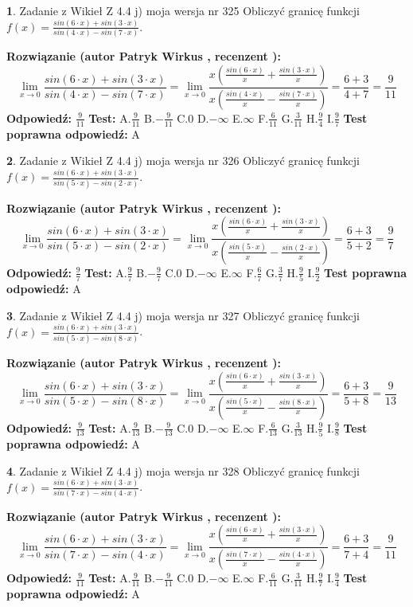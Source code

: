 \documentclass[12pt, a4paper]{article}
\theoremstyle{definition} %
\newtheorem{zad}{}
\newcommand{\zadStart}[1]{\begin{zad}#1\newline}
\newcommand{\zadStop}{\end{zad}}
\newcommand{\rozwStart}[2]{\noindent \textbf{Rozwiązanie (autor #1 , recenzent #2): }\newline}
\newcommand{\rozwStop}{\newline}
\newcommand{\odpStart}{\noindent \textbf{Odpowiedź:}\newline}
\newcommand{\odpStop}{\newline}
\newcommand{\testStart}{\noindent \textbf{Test:}\newline}
\newcommand{\testStop}{\newline}
\newcommand{\kluczStart}{\noindent \textbf{Test poprawna odpowiedź:}\newline}
\newcommand{\kluczStop}{\newline}
\begin{document}
\zadStart{Zadanie z Wikieł Z 4.4 j) moja wersja nr 325}
Obliczyć granicę funkcji $f(x)=\frac{sin(6\cdot x) +sin(3\cdot x)}{sin(4\cdot x) -sin(7\cdot x)}$.
\zadStop
\rozwStart{Patryk Wirkus}{}
$$\lim\limits_{x\to 0}\frac{sin(6\cdot x) +sin(3\cdot x)}{sin(4\cdot x) -sin(7\cdot x)}=\lim\limits_{x\to 0}\frac{x(\frac{sin(6\cdot x)}{x}+\frac{sin(3\cdot x)}{x})}{x(\frac{sin(4\cdot x)}{x}-\frac{sin(7\cdot x)}{x})}=\frac{6+3}{4+7} = \frac{9}{11}$$
\rozwStop
\odpStart
$\frac{9}{11}$
\odpStop
\testStart
A.$\frac{9}{11}$
B.$-\frac{9}{11}$
C.$0$
D.$-\infty$
E.$\infty$
F.$\frac{6}{11}$
G.$\frac{3}{11}$
H.$\frac{9}{4}$
I.$\frac{9}{7}$
\testStop
\kluczStart
A
\kluczStop



\zadStart{Zadanie z Wikieł Z 4.4 j) moja wersja nr 326}
Obliczyć granicę funkcji $f(x)=\frac{sin(6\cdot x) +sin(3\cdot x)}{sin(5\cdot x) -sin(2\cdot x)}$.
\zadStop
\rozwStart{Patryk Wirkus}{}
$$\lim\limits_{x\to 0}\frac{sin(6\cdot x) +sin(3\cdot x)}{sin(5\cdot x) -sin(2\cdot x)}=\lim\limits_{x\to 0}\frac{x(\frac{sin(6\cdot x)}{x}+\frac{sin(3\cdot x)}{x})}{x(\frac{sin(5\cdot x)}{x}-\frac{sin(2\cdot x)}{x})}=\frac{6+3}{5+2} = \frac{9}{7}$$
\rozwStop
\odpStart
$\frac{9}{7}$
\odpStop
\testStart
A.$\frac{9}{7}$
B.$-\frac{9}{7}$
C.$0$
D.$-\infty$
E.$\infty$
F.$\frac{6}{7}$
G.$\frac{3}{7}$
H.$\frac{9}{5}$
I.$\frac{9}{2}$
\testStop
\kluczStart
A
\kluczStop



\zadStart{Zadanie z Wikieł Z 4.4 j) moja wersja nr 327}
Obliczyć granicę funkcji $f(x)=\frac{sin(6\cdot x) +sin(3\cdot x)}{sin(5\cdot x) -sin(8\cdot x)}$.
\zadStop
\rozwStart{Patryk Wirkus}{}
$$\lim\limits_{x\to 0}\frac{sin(6\cdot x) +sin(3\cdot x)}{sin(5\cdot x) -sin(8\cdot x)}=\lim\limits_{x\to 0}\frac{x(\frac{sin(6\cdot x)}{x}+\frac{sin(3\cdot x)}{x})}{x(\frac{sin(5\cdot x)}{x}-\frac{sin(8\cdot x)}{x})}=\frac{6+3}{5+8} = \frac{9}{13}$$
\rozwStop
\odpStart
$\frac{9}{13}$
\odpStop
\testStart
A.$\frac{9}{13}$
B.$-\frac{9}{13}$
C.$0$
D.$-\infty$
E.$\infty$
F.$\frac{6}{13}$
G.$\frac{3}{13}$
H.$\frac{9}{5}$
I.$\frac{9}{8}$
\testStop
\kluczStart
A
\kluczStop



\zadStart{Zadanie z Wikieł Z 4.4 j) moja wersja nr 328}
Obliczyć granicę funkcji $f(x)=\frac{sin(6\cdot x) +sin(3\cdot x)}{sin(7\cdot x) -sin(4\cdot x)}$.
\zadStop
\rozwStart{Patryk Wirkus}{}
$$\lim\limits_{x\to 0}\frac{sin(6\cdot x) +sin(3\cdot x)}{sin(7\cdot x) -sin(4\cdot x)}=\lim\limits_{x\to 0}\frac{x(\frac{sin(6\cdot x)}{x}+\frac{sin(3\cdot x)}{x})}{x(\frac{sin(7\cdot x)}{x}-\frac{sin(4\cdot x)}{x})}=\frac{6+3}{7+4} = \frac{9}{11}$$
\rozwStop
\odpStart
$\frac{9}{11}$
\odpStop
\testStart
A.$\frac{9}{11}$
B.$-\frac{9}{11}$
C.$0$
D.$-\infty$
E.$\infty$
F.$\frac{6}{11}$
G.$\frac{3}{11}$
H.$\frac{9}{7}$
I.$\frac{9}{4}$
\testStop
\kluczStart
A
\kluczStop
\end{document}
